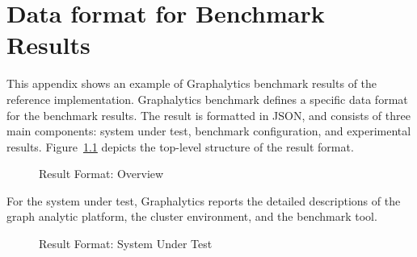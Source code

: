 \chapter{Data format for Benchmark Results}
\label{chap:data-format}

This appendix shows an example of Graphalytics benchmark results of the reference implementation. Graphalytics benchmark defines a specific data format for the benchmark results. The result is formatted in JSON, and consists of three main components: system under test, benchmark configuration, and experimental results. Figure~\ref{fig:result-format:overview} depicts the top-level structure of the result format.

\begin{figure}[h]
	\centering
	\caption{Result Format: Overview}
	\label{fig:result-format:overview}
\end{figure}

For the system under test, Graphalytics reports the detailed descriptions of the graph analytic platform, the cluster environment, and the benchmark tool.

\begin{figure}[!h]
	\centering
	\caption{Result Format: System Under Test}
	\label{fig:result-format:system}
\end{figure}


